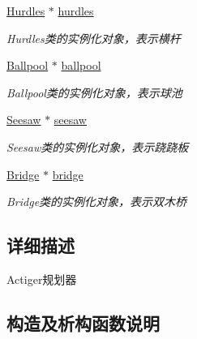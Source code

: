 \begin{DoxyCompactItemize}
\hyperlink{classquadruped_1_1Hurdles}{Hurdles} $\ast$ \hyperlink{classquadruped_1_1MotionPlan_a0e6e197d5f0601600c4a05c36168cbcb}{hurdles}
\begin{DoxyCompactList}\small\item\em Hurdles类的实例化对象，表示横杆 \end{DoxyCompactList}\item 
\mbox{\label{classquadruped_1_1MotionPlan_ad5b9d0be05dcdf97ee22816146112e88}} 
\hyperlink{classquadruped_1_1Ballpool}{Ballpool} $\ast$ \hyperlink{classquadruped_1_1MotionPlan_ad5b9d0be05dcdf97ee22816146112e88}{ballpool}
\begin{DoxyCompactList}\small\item\em Ballpool类的实例化对象，表示球池 \end{DoxyCompactList}\item 
\mbox{\label{classquadruped_1_1MotionPlan_ad297ad596a1a813b45c4e28f11304a32}} 
\hyperlink{classquadruped_1_1Seesaw}{Seesaw} $\ast$ \hyperlink{classquadruped_1_1MotionPlan_ad297ad596a1a813b45c4e28f11304a32}{seesaw}
\begin{DoxyCompactList}\small\item\em Seesaw类的实例化对象，表示跷跷板 \end{DoxyCompactList}\item 
\mbox{\label{classquadruped_1_1MotionPlan_acbac0999d3d2cb246734b0eba01a01b9}} 
\hyperlink{classquadruped_1_1Bridge}{Bridge} $\ast$ \hyperlink{classquadruped_1_1MotionPlan_acbac0999d3d2cb246734b0eba01a01b9}{bridge}
\begin{DoxyCompactList}\small\item\em Bridge类的实例化对象，表示双木桥 \end{DoxyCompactList}\end{DoxyCompactItemize}


\subsection{详细描述}
Actiger规划器 

\subsection{构造及析构函数说明}
\mbox{\label{classquadruped_1_1MotionPlan_af79f137bc037fa02681bded5c26b3a98}} 

